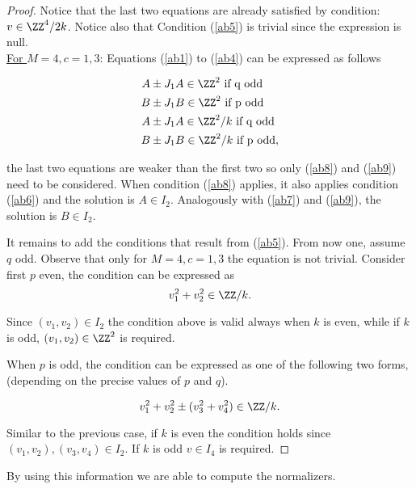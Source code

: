 \documentclass[12pt]{amsart}
\theoremstyle{plain}
\theoremstyle{definition}
\theoremstyle{remark}
\begin{document}
\begin{proof}
Notice that the last two equations are already satisfied by condition: $v \in \ZZ^4/{2k}$. Notice also that Condition (\ref{ab5}) is trivial since the expression is null.\\


\underline{For $M=4, c=1,3$}: Equations (\ref{ab1}) to (\ref{ab4}) can be expressed as follows

\begin{align}
    A& \pm J_1 A \in \ZZ^2 \text{ if q odd} \label{ab8}\\
    B& \pm J_1 B \in \ZZ^2 \text{ if p odd} \label{ab9}\\
    A& \pm J_1 A \in \ZZ^2/k \text{ if q odd} \nonumber \\
    B& \pm J_1 B \in \ZZ^2/k \text{ if p odd}, \nonumber
\end{align}

the last two equations are weaker than the first two so only (\ref{ab8}) and (\ref{ab9}) need to be considered. When condition (\ref{ab8}) applies, it also applies condition (\ref{ab6}) and the solution is $A \in I_2$. Analogously with (\ref{ab7}) and (\ref{ab9}), the solution is $B \in I_2$.

It remains to add the conditions that result from (\ref{ab5}). From now one, assume $q$ odd. Observe that only for $M=4, c=1,3$ the equation is not trivial. Consider first $p$ even, the condition can be expressed  as
$$ v_1^2 + v_2^2 \in \ZZ/k. $$

Since $(v_1,v_2) \in  I_2$ the condition above is valid always when $k$ is even, while if $k$ is odd, $(v_1,v_2) \in \ZZ^2$ is required. 

When $p$ is odd, the condition can be expressed as one of the following two forms, (depending on the precise values of $p$ and $q$).

$$ v_1^2 + v_2^2 \pm (v_3^2 + v_4^2) \in \ZZ/k.$$

Similar to the previous case, if $k$ is even the  condition holds since $(v_1,v_2), (v_3,v_4) \in I_2$. If $k$ is odd $v \in I_4$ is required.









    
        

    
\end{proof}


By using this information we are able to compute the normalizers. 
\end{document}
